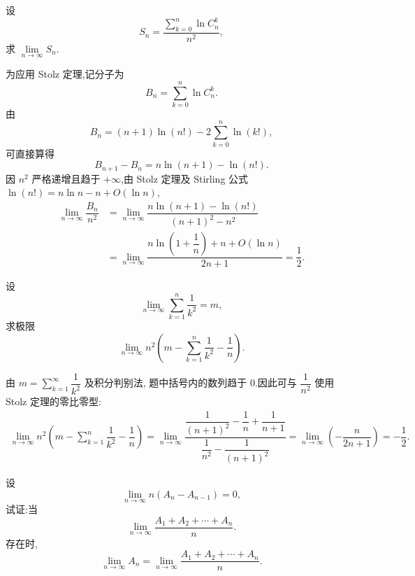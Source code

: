 \begin{example}
  设
  \[
    S_n=\dfrac{\displaystyle\sum\limits_{k=0}^n\ln C_{n}^{k}}{n^2},
  \]
  求 $\displaystyle \lim\limits_{n\to\infty}S_n$.
\end{example}
\exampleblank

\begin{solution}
  为应用 Stolz 定理,记分子为
  \[
    B_n=\sum\limits_{k=0}^n\ln C_n^k.
  \]
  由
  \[
    B_n=(n+1)\ln(n!)-2\sum\limits_{k=0}^n\ln(k!),
  \]
  可直接算得
  \[
    B_{n+1}-B_n=n\ln(n+1)-\ln(n!).
  \]
  因 $n^2$ 严格递增且趋于 $+\infty$,由 Stolz 定理及 Stirling 公式
  $\ln(n!)=n\ln n-n+O(\ln n)$,
  \[
    \begin{aligned}
    \lim\limits_{n\to\infty}\dfrac{B_n}{n^2}
    &=\lim\limits_{n\to\infty}
      \dfrac{n\ln(n+1)-\ln(n!)}{(n+1)^2-n^2}\\
    &=\lim\limits_{n\to\infty}
      \dfrac{n\ln\left(1+\dfrac{1}{n}\right)+n+O(\ln n)}{2n+1}
    =\dfrac{1}{2}.
    \end{aligned}
  \]
\end{solution}

\begin{example}
  设
  \[
    \displaystyle\lim\limits_{n\to\infty}\sum\limits_{k=1}^n\dfrac{1}{k^2}=m,
  \]
  求极限
  \[
    \displaystyle\lim\limits_{n\to\infty}
    n^2\left(m-\sum\limits_{k=1}^n\dfrac{1}{k^2}-\dfrac{1}{n}\right).
  \]
\end{example}
\exampleblank

\begin{solution}
  由 $m=\displaystyle\sum\limits_{k=1}^{\infty}\dfrac{1}{k^2}$ 及积分判别法,
  题中括号内的数列趋于 $0$.因此可与 $\dfrac{1}{n^2}$ 使用 Stolz 定理的零比零型:
  \[
    \begin{aligned}
    \lim\limits_{n\to\infty}
    n^2\left(m-\sum\limits_{k=1}^n\dfrac{1}{k^2}-\dfrac{1}{n}\right)
    =\lim\limits_{n\to\infty}
    \dfrac{
      \dfrac{1}{(n+1)^2}-\dfrac{1}{n}+\dfrac{1}{n+1}
    }{
      \dfrac{1}{n^2}-\dfrac{1}{(n+1)^2}
    }
    =\lim\limits_{n\to\infty}\left(-\dfrac{n}{2n+1}\right)
    =-\dfrac{1}{2}.
    \end{aligned}
  \]
\end{solution}

\begin{example}
  设
  \[
    \displaystyle\lim\limits_{n\to\infty}n(A_n-A_{n-1})=0,
  \]
  试证:当
  \[
    \displaystyle\lim\limits_{n\to\infty}\dfrac{A_1+A_2+\cdots+A_n}{n}.
  \]
  存在时,
  \[
    \displaystyle\lim\limits_{n\to\infty}A_n
    =
    \lim\limits_{n\to\infty}\dfrac{A_1+A_2+\cdots+A_n}{n}.
  \]
\end{example}
\exampleblank

